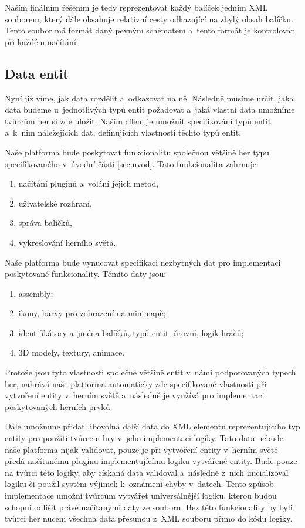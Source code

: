 Naším finálním řešením je tedy reprezentovat každý balíček jedním XML souborem, který dále obsahuje relativní cesty odkazující na zbylý obsah balíčku. Tento soubor má formát daný pevným schématem a~tento formát je kontrolován při každém načítání. 

\subsection{Data entit}
Nyní již víme, jak data rozdělit a~odkazovat na ně. Následně musíme určit, jaká data budeme u~jednotlivých typů entit požadovat a~jaká vlastní data umožníme tvůrcům her si zde uložit. Naším cílem je umožnit specifikování typů entit a~k~nim náležejících dat, definujících vlastnosti těchto typů entit. 

Naše platforma bude poskytovat funkcionalitu společnou většině her typu specifikovaného v~úvodní části \ref{sec:uvod}. 
Tato funkcionalita zahrnuje:
\begin{enumerate}
	\item načítání pluginů a~volání jejich metod,
	\item uživatelské rozhraní,
	\item správa balíčků,
	\item vykreslování herního světa.
\end{enumerate} 

Naše platforma bude vynucovat specifikaci nezbytných dat pro implementaci poskytované funkcionality. Těmito daty jsou:
\begin{enumerate}
	\item assembly;
	\item ikony, barvy pro zobrazení na minimapě;
	\item identifikátory a~jména balíčků, typů entit, úrovní, logik hráčů;
	\item 3D modely, textury, animace.
\end{enumerate}
Protože jsou tyto vlastnosti společné většině entit v~námi podporovaných typech her, nahrává naše platforma automaticky zde specifikované vlastnosti při vytvoření entity v~herním světě a~následně je využívá pro implementaci poskytovaných herních prvků.

Dále umožníme přidat libovolná další data do XML elementu reprezentujícího typ entity pro použití tvůrcem hry v~jeho implementaci logiky. Tato data nebude naše platforma nijak validovat, pouze je při vytvoření entity v~herním světě předá načítanému pluginu implementujícímu logiku vytvářené entity. Bude pouze na tvůrci této logiky, aby získaná data validoval a~následně z~nich inicializoval logiku či použil systém výjimek k~oznámení chyby v~datech. Tento způsob implementace umožní tvůrcům vytvářet universálnější logiku, kterou budou schopni odlišit právě načítanými daty ze souboru. Bez této funkcionality by byli tvůrci her nuceni všechna data přesunou z~XML souboru přímo do kódu logiky.

